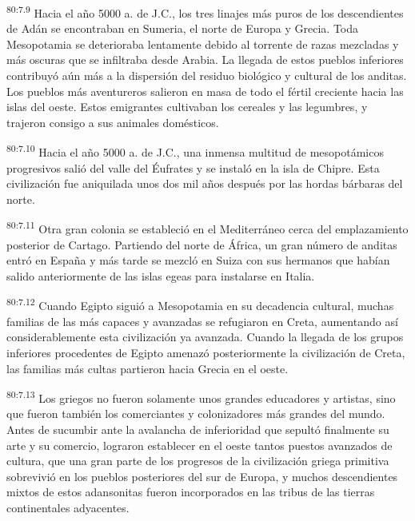 \par
\textsuperscript{80:7.9} Hacia el año 5000 a. de J.C., los tres linajes más puros de los descendientes de Adán se encontraban en Sumeria, el norte de Europa y Grecia. Toda Mesopotamia se deterioraba lentamente debido al torrente de razas mezcladas y más oscuras que se infiltraba desde Arabia. La llegada de estos pueblos inferiores contribuyó aún más a la dispersión del residuo biológico y cultural de los anditas. Los pueblos más aventureros salieron en masa de todo el fértil creciente hacia las islas del oeste. Estos emigrantes cultivaban los cereales y las legumbres, y trajeron consigo a sus animales domésticos.

\par
\textsuperscript{80:7.10} Hacia el año 5000 a. de J.C., una inmensa multitud de mesopotámicos progresivos salió del valle del Éufrates y se instaló en la isla de Chipre. Esta civilización fue aniquilada unos dos mil años después por las hordas bárbaras del norte.

\par
\textsuperscript{80:7.11} Otra gran colonia se estableció en el Mediterráneo cerca del emplazamiento posterior de Cartago. Partiendo del norte de África, un gran número de anditas entró en España y más tarde se mezcló en Suiza con sus hermanos que habían salido anteriormente de las islas egeas para instalarse en Italia.

\par
\textsuperscript{80:7.12} Cuando Egipto siguió a Mesopotamia en su decadencia cultural, muchas familias de las más capaces y avanzadas se refugiaron en Creta, aumentando así considerablemente esta civilización ya avanzada. Cuando la llegada de los grupos inferiores procedentes de Egipto amenazó posteriormente la civilización de Creta, las familias más cultas partieron hacia Grecia en el oeste.

\par
\textsuperscript{80:7.13} Los griegos no fueron solamente unos grandes educadores y artistas, sino que fueron también los comerciantes y colonizadores más grandes del mundo. Antes de sucumbir ante la avalancha de inferioridad que sepultó finalmente su arte y su comercio, lograron establecer en el oeste tantos puestos avanzados de cultura, que una gran parte de los progresos de la civilización griega primitiva sobrevivió en los pueblos posteriores del sur de Europa, y muchos descendientes mixtos de estos adansonitas fueron incorporados en las tribus de las tierras continentales adyacentes.

